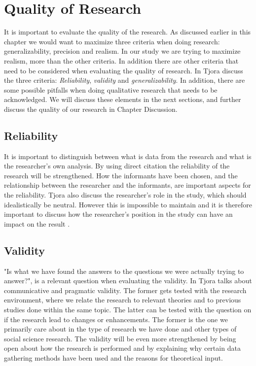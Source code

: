 \section{Quality of Research}
It is important to evaluate the quality of the research. As discussed earlier in this chapter we would want to maximize three criteria when doing research: generalizability, precision and realism. In our study we are trying to maximize realism, more than the other criteria. In addition there are other criteria that need to be considered when evaluating the quality of research. In \cite{tjora} Tjora discuss the three criteria: \emph{Reliability}, \emph{validity} and \emph{generalizability}. In addition, there are some possible pitfalls when doing qualitative research that needs to be acknowledged. We will discuss these elements in the next sections, and further discuss the quality of our research in Chapter Discussion.  

\subsection{Reliability}
It is important to distinguish between what is data from the research and what is the researcher's own analysis. By using direct citation the reliability of the research will be strengthened. How the informants have been chosen, and the relationship between the researcher and the informants, are important aspects for the reliability. Tjora also discuss the researcher's role in the study, which should idealistically be neutral. However this is impossible to maintain and it is therefore important to discuss how the researcher's position in the study can have an impact on the result \cite{tjora}.

\subsection{Validity}
"Is what we have found the answers to the questions we were actually trying to answer?", is a relevant question when evaluating the validity. In \cite{tjora} Tjora talks about communicative and pragmatic validity. The former gets tested with the research environment, where we relate the research to relevant theories and to previous studies done within the same topic. The latter can be tested with the question on if the research lead to changes or enhancements. The former is the one we primarily care about in the type of research we have done and other types of social science research. The validity will be even more strengthened by being open about how the research is performed and by explaining why certain data gathering methods have been used and the reasons for theoretical input. 

